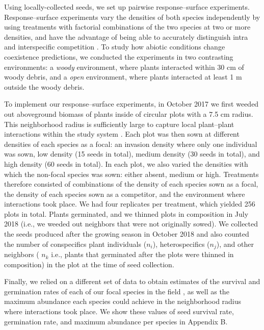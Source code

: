 \begin{refsection}
Using locally-collected seeds, we set up pairwise response--surface experiments. Response--surface experiments vary the densities of both species independently by using treatments with factorial combinations of the two species at two or more densities, and have the advantage of being able to accurately distinguish intra and interspecific competition \citep{inouye_response_2001, hart2018quantify}. To study how abiotic conditions change coexistence predictions, we conducted the experiments in two contrasting environments: a \textit{woody} environment, where plants interacted within 30 cm of woody debris, and a \textit{open} environment, where plants interacted at least 1 m outside the woody debris.

To implement our response--surface experiments, in October 2017 we first weeded out aboveground biomass of plants inside of circular plots with a 7.5 cm radius. This neighborhood radius is sufficiently large to capture local plant--plant interactions within the study system \citep{martyn2021identifying}. Each plot was then sown at different densities of each species as a focal: an invasion density where only one individual was sown, low density (15 seeds in total), medium density (30 seeds in total), and high density (60 seeds in total). In each plot, we also varied the densities with which the non-focal species was sown: either absent, medium or high. Treatments therefore consisted of combinations of the density of each species sown as a focal, the density of each species sown as a competitor, and the environment where interactions took place. We had four replicates per treatment, which yielded 256 plots in total. Plants germinated, and we thinned plots in composition in July 2018 (i.e., we weeded out neighbors that were not originally sowed). We collected the seeds produced after the growing season in October 2018 and also counted the number of conspecifics plant individuals ($n_{i}$), heterospecifics ($n_{j}$), and other neighbors ( $n_{k}$ i.e., plants that germinated after the plots were thinned in composition) in the plot at the time of seed collection.

Finally, we relied on a different set of data to obtain estimates of the survival and germination rates of each of our focal species in the field \citep{towers2021variable}, as well as the maximum abundance each species could achieve in the neighborhood radius where interactions took place. We show these values of seed survival rate, germination rate, and maximum abundance per species in Appendix B.


\end{refsection}
